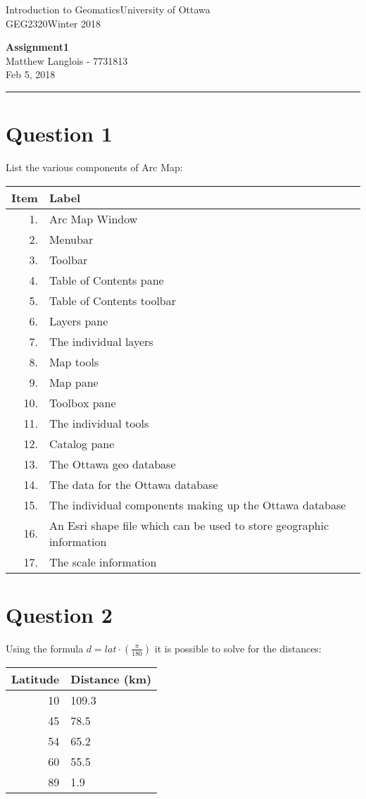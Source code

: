 \documentclass[fleqn, 12pt]{article}
\newcommand{\university}{University of Ottawa}
\newcommand{\name}{Matthew Langlois}
\newcommand{\studentNumber}{7731813}
\newcommand{\semester}{Winter 2018}
\newcommand{\assignmentType}{Assignment}
\newcommand{\assignmentNumber}{1}
\newcommand{\dueDate}{Feb 5, 2018}
\newcommand{\courseCode}{GEG2320}
\newcommand{\courseTitle}{Introduction to Geomatics}
\newcommand{\essayTitle}{<Title>} %
\newcommand{\essaySubtitle}{<subtitle>} %
\newcommand{\essayAbstract}{} %
\newcommand{\beginassignemnt}{
    \newlength\tindent
    \setlength{\tindent}{\parindent}
    \setlength{\parindent}{0pt}

    \thispagestyle{assignment}
    \noindent
    \courseTitle \hfill \university\\
    \courseCode \hfill \semester
    \begin{center}
        \textbf{\assignmentType\text{ }\ifdefempty{\assignmentNumber}{}{\#}\assignmentNumber}\\
        \name \hspace{1pt} - \studentNumber\\
        \dueDate\\
    \end{center}
    \vspace{6pt}
    \hrule
    \vspace{1.5\headsep}
}
\newcommand{\beginessay}{
    \nocite{*}

    \pagestyle{frontmatter}
    \pagenumbering{roman}

    \begin{center}
        \normalsize
        \textsc{\university}\\[5cm]
        \LARGE \textbf{\MakeUppercase{\essayTitle}}\\[0.5cm]
        \large \text{ }\essaySubtitle\text{ }\\[10cm] %
        \normalsize
        \textsc{\name}\\
        \textsc{\studentNumber}\\
        \textsc{\courseCode}\\
        \textsc{\semester}\\
        \textsc{\dueDate}
    \end{center}
    \thispagestyle{empty}

    \newpage
    \tableofcontents
    \newpage

    \iftotalfigures
        \addcontentsline{toc}{section}{\listfigurename}
        \listoffigures
    \fi
    \iftotaltables
        \addcontentsline{toc}{section}{\listtablename}
        \listoftables
    \fi

    \ifdefempty{\essayAbstract}{}{
        \newpage
        \addcontentsline{toc}{section}{Abstract}
        \begin{abstract}
            \essayAbstract
        \end{abstract}

    }
    \label{EndFrontMatter}
    \newpage

    \pagenumbering{arabic}
    \pagestyle{body}
}
\begin{document}
\beginassignemnt

\section*{Question 1}

List the various components of Arc Map:\\

\begin{tabular}{rl}
    \hline

    Item & Label \\\hline

    1. & Arc Map Window\\
    2. & Menubar\\
    3. & Toolbar\\
    4. & Table of Contents pane\\
    5. & Table of Contents toolbar\\
    6. & Layers pane\\
    7. & The individual layers\\
    8. & Map tools\\
    9. & Map pane\\
    10. & Toolbox pane\\
    11. & The individual tools\\
    12. & Catalog pane\\
    13. & The Ottawa geo database\\
    14. & The data for the Ottawa database\\
    15. & The individual components making up the Ottawa database\\
    16. & An Esri shape file which can be used to store geographic information\\
    17. & The scale information\\\hline

\end{tabular}


\section*{Question 2}

Using the formula $d=lat \cdot (\frac{\pi}{180})$ it is possible to solve for the distances:\\

\begin{tabular}{rl}
    \hline
    Latitude & Distance (km)\\\hline

    10 & 109.3\\
    45 & 78.5\\
    54 & 65.2\\
    60 & 55.5\\
    89 & 1.9\\\hline
\end{tabular}\\
\end{document}
